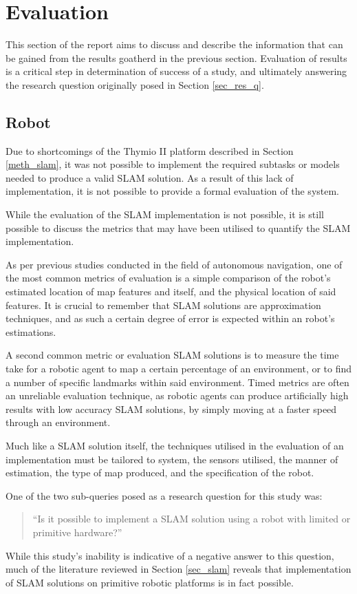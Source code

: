 \section{Evaluation}
This section of the report aims to  discuss and describe the information that
can be gained from the results goatherd in the previous section.
Evaluation of results is a critical step in determination of success of a
study, and ultimately answering the research question originally posed in
Section \ref{sec_res_q}.

\subsection{Robot}
Due to shortcomings of the Thymio II platform described in Section
\ref{meth_slam}, it was not possible to implement the required subtasks or
models needed to produce a valid SLAM solution.
As a result of this lack of implementation, it is not possible to provide a
formal evaluation of the system.

While the evaluation  of the SLAM implementation is not possible, it is still
possible to discuss the metrics that may have been utilised to quantify the
SLAM implementation.

As per previous studies conducted in the field of autonomous navigation, one of
the most common metrics of evaluation is a simple comparison of the robot's
estimated location of map features and itself, and the physical location of
said features.
It is crucial to remember that SLAM solutions are approximation techniques,
and as such a certain degree of error is expected within an robot's
estimations.

A second common metric or evaluation SLAM solutions is to measure the time
take for a robotic agent to map a certain percentage of an environment, or to
find a number of specific landmarks within said environment.
Timed metrics are often an unreliable evaluation technique, as robotic agents
can produce artificially high results with low accuracy SLAM solutions, by
simply moving at a faster speed through an environment.

Much like a SLAM solution itself, the techniques utilised in the evaluation of
an implementation must be tailored to system, the sensors utilised, the manner
of estimation, the type of map produced, and the specification of the robot.

One of the two sub-queries posed as a research question for this study was:
\begin{quote}
``Is it possible to implement a SLAM solution using a robot with limited or
primitive hardware?''
\end{quote}
While this study's inability is indicative of a negative answer to this
question, much of the literature reviewed in Section \ref{sec_slam} reveals
that implementation of SLAM solutions on primitive robotic platforms is in
fact possible.

